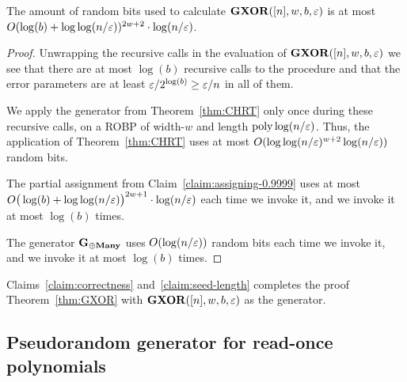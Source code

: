 \begin{claim}\label{claim:seed-length}
	The amount of random bits used to calculate $\mathbf{GXOR}([n],w, b,\varepsilon)$ is at most $O(\log(b) + \log\log(n/\varepsilon))^{2w+2} \cdot \log(n/\varepsilon)$.
\end{claim}
\begin{proof}
Unwrapping the recursive calls in the evaluation of $\mathbf{GXOR}([n],w, b,\varepsilon)$ we see that there are at most $\log(b)$ recursive calls to the procedure and that the error parameters are at least $\varepsilon/2^{\log(b)} \ge \varepsilon/n$ in all of them.

We apply the generator from Theorem~\ref{thm:CHRT} only once during these recursive calls, on a ROBP of width-$w$ and length ${\mathrm{poly}}\log(n/\varepsilon)$. Thus, the application of Theorem~\ref{thm:CHRT} uses at most  $O(\log\log(n/\varepsilon)^{w+2} \log(n/\varepsilon))$ random bits.

The partial assignment from Claim~\ref{claim:assigning-0.9999} uses  at most $O\big(\log(b) + \log\log(n/\varepsilon)\big)^{2w+1} \cdot \log(n/\varepsilon)$ each time we invoke it, and we invoke it at most $\log(b)$ times.

The generator $\mathbf{G_{\oplus Many}}$ uses $O(\log (n/\varepsilon))$ random bits each time we invoke it, and we invoke it at most $\log(b)$ times.
\end{proof}

Claims~\ref{claim:correctness} and~\ref{claim:seed-length} completes the proof Theorem~\ref{thm:GXOR} with $\mathbf{GXOR}([n], w, b, \varepsilon)$ as the generator.



\subsection{Pseudorandom generator for read-once polynomials}

